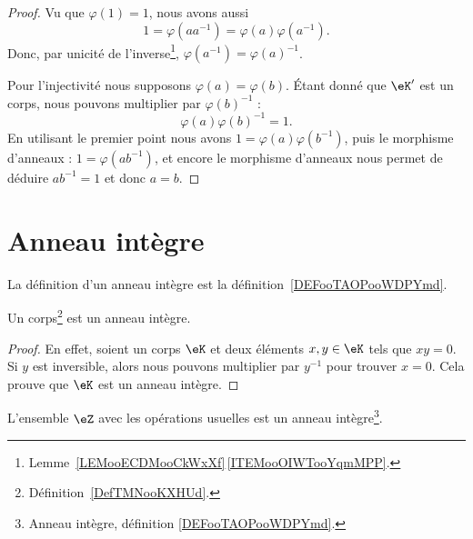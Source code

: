 \begin{proof}
	Vu que \( \varphi(1)=1\), nous avons aussi
	\begin{equation}
		1=\varphi(aa^{-1})=\varphi(a)\varphi(a^{-1}).
	\end{equation}
	Donc, par unicité de l'inverse\footnote{Lemme~\ref{LEMooECDMooCkWxXf}\,\ref{ITEMooOIWTooYqmMPP}.}, \( \varphi(a^{-1})=\varphi(a)^{-1}\).

	Pour l'injectivité nous supposons \( \varphi(a)=\varphi(b)\). Étant donné que \( \eK'\) est un corps, nous pouvons multiplier par \( \varphi(b)^{-1}\) :
	\begin{equation}
		\varphi(a)\varphi(b)^{-1}=1.
	\end{equation}
	En utilisant le premier point nous avons \( 1=\varphi(a)\varphi(b^{-1})\), puis le morphisme d'anneaux : \( 1=\varphi(ab^{-1})\), et encore le morphisme d'anneaux nous permet de déduire \( ab^{-1}=1\) et donc \(a=b\).
\end{proof}

\section{Anneau intègre}
\label{SECAnneauxIntegres}

La définition d'un anneau intègre est la définition~\ref{DEFooTAOPooWDPYmd}.

\begin{lemma}     \label{LEMooZSMEooUmSXWZ}
	Un corps\footnote{Définition~\ref{DefTMNooKXHUd}.} est un anneau intègre.
\end{lemma}

\begin{proof}
	En effet, soient un corps \( \eK\) et deux éléments \( x,y\in \eK\) tels que \( xy=0\). Si \( y\) est inversible, alors nous pouvons multiplier par \( y^{-1}\) pour trouver \( x=0\). Cela prouve que \( \eK\) est un anneau intègre.
\end{proof}

\begin{example}     \label{EXooLDXRooSxUAXs}
	L'ensemble \( \eZ\) avec les opérations usuelles est un anneau intègre\footnote{Anneau intègre, définition \ref{DEFooTAOPooWDPYmd}.}.
\end{example}

